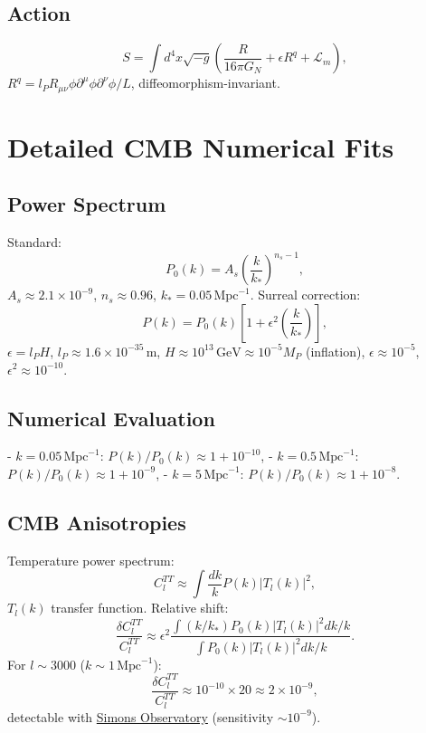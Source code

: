 \documentclass{article}
\begin{document}
\subsection{Action}
\begin{equation}
S = \int d^4x \sqrt{-g} \left( \frac{R}{16\pi G_N} + \epsilon R^q + \mathcal{L}_m \right),
\end{equation}
\(R^q = l_P R_{\mu\nu} \phi \partial^\mu \phi \partial^\nu \phi / L\), diffeomorphism-invariant.

\section{Detailed CMB Numerical Fits}
\subsection{Power Spectrum}
Standard:
\begin{equation}
P_0(k) = A_s \left( \frac{k}{k_*} \right)^{n_s-1},
\end{equation}
\(A_s \approx 2.1 \times 10^{-9}\), \(n_s \approx 0.96\), \(k_* = 0.05 \, \text{Mpc}^{-1}\). Surreal correction:
\begin{equation}
P(k) = P_0(k) \left[ 1 + \epsilon^2 \left( \frac{k}{k_*} \right) \right],
\end{equation}
\(\epsilon = l_P H\), \(l_P \approx 1.6 \times 10^{-35} \, \text{m}\), \(H \approx 10^{13} \, \text{GeV} \approx 10^{-5} M_P\) (inflation), \(\epsilon \approx 10^{-5}\), \(\epsilon^2 \approx 10^{-10}\).

\subsection{Numerical Evaluation}
- \(k = 0.05 \, \text{Mpc}^{-1}\): \(P(k) / P_0(k) \approx 1 + 10^{-10}\),
- \(k = 0.5 \, \text{Mpc}^{-1}\): \(P(k) / P_0(k) \approx 1 + 10^{-9}\),
- \(k = 5 \, \text{Mpc}^{-1}\): \(P(k) / P_0(k) \approx 1 + 10^{-8}\).

\subsection{CMB Anisotropies}
Temperature power spectrum:
\begin{equation}
C_l^{TT} \approx \int \frac{dk}{k} P(k) |T_l(k)|^2,
\end{equation}
\(T_l(k)\) transfer function. Relative shift:
\begin{equation}
\frac{\delta C_l^{TT}}{C_l^{TT}} \approx \epsilon^2 \frac{\int (k/k_*) P_0(k) |T_l(k)|^2 dk/k}{\int P_0(k) |T_l(k)|^2 dk/k}.
\end{equation}
For \(l \sim 3000\) (\(k \sim 1 \, \text{Mpc}^{-1}\)):
\begin{equation}
\frac{\delta C_l^{TT}}{C_l^{TT}} \approx 10^{-10} \times 20 \approx 2 \times 10^{-9},
\end{equation}
detectable with \href{https://simonsobservatory.org/}{Simons Observatory} (sensitivity \(\sim 10^{-9}\)).
\end{document}
